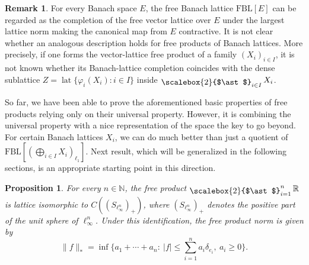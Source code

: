 \documentclass[12pt]{amsart}
\DeclareMathOperator{\lat}{lat}
\newcommand{\FBL}{\mathrm{FBL}}
\DeclareMathOperator*{\bigfree}{\raisebox{-0.6ex}{\scalebox{2}{$\ast$}}}
\theoremstyle{plain}
\newtheorem{proposition}[theorem]{Proposition}
\theoremstyle{definition}
\newtheorem{remark}[theorem]{Remark}
\begin{document}
\begin{remark}\label{rem:freeveclat}
For every Banach space $E$, the free Banach lattice $\FBL[E]$ can be regarded as the completion of the free vector lattice over $E$ under the largest lattice norm making the canonical map from $E$ contractive. It is not clear whether an analogous description holds for free products of Banach lattices. More precisely, if one forms the vector-lattice free product of a family $(X_i)_{i\in I}$, it is not known whether its Banach-lattice completion coincides with the dense sublattice $Z=\lat\{\varphi_i(X_i):i\in I\}$ inside $\bigfree_{i\in I}X_i$.
\end{remark}

So far, we have been able to prove the aforementioned basic properties of free products relying only on their universal property. However, it is combining the universal property with a nice representation of the space the key to go beyond. For certain Banach lattices $X_i$, we can do much better than just a quotient of $\FBL[(\bigoplus_{i\in I} X_i)_{\ell_1}]$. Next result, which will be generalized in the following sections, is an appropriate starting point in this direction. 

\begin{proposition}\label{prop:Rn}
For every $n\in \mathbb{N}$, the free product $\bigfree_{i=1}^n\mathbb{R}$ is lattice isomorphic to $C((S_{\ell_\infty^n})_+)$, where $(S_{\ell_\infty^n})_+$ denotes the positive part of the unit sphere of $\ell_\infty^n$. Under this identification, the free product norm is given by
\[
\|f\|_*=\inf\Big\{a_1+\cdots+a_n:\ |f|\leq \sum_{i=1}^n a_i \delta_{e_i},\ a_i\geq 0\Big\}.
\] 

\end{proposition}
\end{document}
